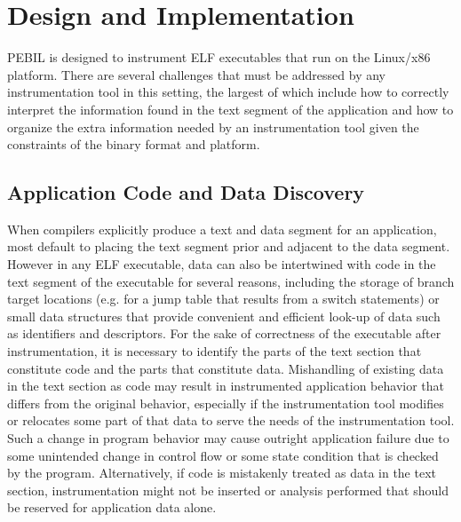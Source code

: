 \section{Design and Implementation}
\label{sec:Overview}

PEBIL is designed to instrument ELF executables that run on the Linux/x86
platform. There are several challenges that must be addressed by any
instrumentation tool in this setting, the largest of which include how to
correctly interpret the information found in the text segment of the application
and how to organize the extra information needed by an instrumentation tool
given the constraints of the binary format and platform.

\subsection{Application Code and Data Discovery}
When compilers explicitly produce a text and data segment for an application,
most default to placing the text segment prior and adjacent to the data segment.
However in any ELF executable, data can also be intertwined with code in the
text segment of the executable for several reasons, including the storage of
branch target locations (e.g. for a jump table that results from a switch
statements) or small data structures that provide convenient and efficient
look-up of data such as identifiers and descriptors. For the sake of correctness
of the executable after instrumentation, it is necessary to identify the parts
of the text section that constitute code and the parts that constitute data.
Mishandling of existing data in the text section as code may result in
instrumented application behavior that differs from the original behavior,
especially if the instrumentation tool modifies or relocates some part of that
data to serve the needs of the instrumentation tool. Such a change in program
behavior may cause outright application failure due to some unintended change in
control flow or some state condition that is checked by the program.
Alternatively, if code is mistakenly treated as data in the text section,
instrumentation might not be inserted or analysis performed that should be
reserved for application data alone.

